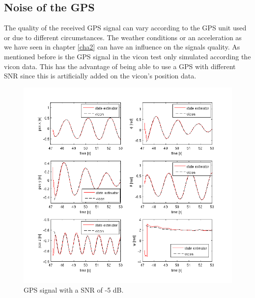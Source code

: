 \subsection{Noise of the GPS}\label{noise}
The quality of the received GPS signal can vary according to the GPS unit used or due to different circumstances. The weather conditions or  an acceleration as we have seen in chapter \ref{cha2} can have an influence on the signals quality. As mentioned before is the GPS signal in the vicon test only simulated according the vicon data. This has the advantage of being able to use a GPS with different SNR since this is artificially added on the vicon's position data.
\begin{figure}[hb]
\centering
\includegraphics[width=1\textwidth]{pictures/2_2_SNR5_detail_GPS.png}
\caption{GPS signal with a SNR of -5 dB.}
\label{detail_5snr}
\end{figure}
